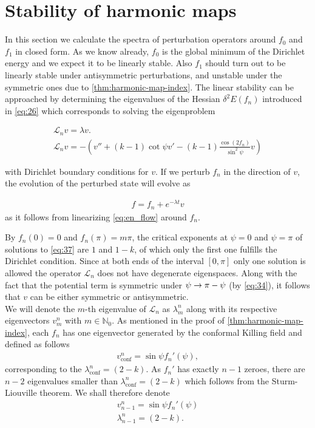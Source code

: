 \section{Stability of harmonic maps}
\label{sec:stab-ground-stat}

In this section we calculate the spectra of perturbation operators
around $f_0$ and $f_1$ in closed form. As we know already, $f_0$ is
the global minimum of the Dirichlet energy and we expect it to be
linearly stable. Also $f_1$ should turn out to be linearly stable
under antisymmetric perturbations, and unstable under the symmetric
ones due to \ref{thm:harmonic-map-index}. The linear stability can be
approached by determining the eigenvalues of the Hessian
$\delta^2E(f_n)$ introduced in \eqref{eq:26} which corresponds to
solving the eigenproblem

\begin{align}
  \label{eq:f0_L}
  \mathcal{L}_n v = \lambda v. \\
  \label{eq:37}
  \mathcal{L}_n v = -\left(v''+(k-1)\cot\psi
    v'-(k-1)\frac{\cos(2f_n)}{\sin^2\psi}v\right)
\end{align}

with Dirichlet boundary conditions for $v$. If we perturb $f_n$ in the
direction of $v$, the evolution of the perturbed state will evolve as

\begin{align}
  \label{eq:42}
  f=f_n+e^{-\lambda t}v
\end{align}
as it follows from linearizing \eqref{eq:en_flow} around $f_n$.

By $f_n(0)=0$ and $f_n(\pi)=m\pi$, the critical exponents at $\psi=0$
and $\psi=\pi$ of solutions to \eqref{eq:37} are $1$ and $1-k$, of
which only the first one fulfills the Dirichlet condition. Since at
both ends of the interval $[0,\pi]$ only one solution is allowed the
operator $\mathcal{L}_n$ does not have degenerate eigenspaces. Along
with the fact that the potential term is symmetric under
$\psi\rightarrow\pi-\psi$ (by \eqref{eq:34}), it follows that $v$
can be either symmetric or antisymmetric.\\

We will denote the $m$-th eigenvalue of $\mathcal{L}_n$ as
$\lambda_m^n$ along with its respective eigenvectors $v_m^n$ with
$m\in\mathbb{N}_0$. As mentioned in the proof of
\ref{thm:harmonic-map-index}, each $f_n$ has one eigenvector generated
by the conformal Killing field and defined as follows
\begin{align}
  \label{eq:43}
  v_{\text{conf}}^n=\sin\psi f_n'(\psi),
\end{align}
corresponding to the $\lambda_{\text{conf}}^n=(2-k)$. As $f_n'$ has
exactly $n-1$ zeroes, there are $n-2$ eigenvalues smaller than
$\lambda_{\text{conf}}^n=(2-k)$ which follows from the Sturm-Liouville
theorem. We shall therefore denote
\begin{align}
  \label{eq:46}
  v_{n-1}^n=\sin\psi f_n'(\psi)\\
  \lambda_{n-1}^n=(2-k).
\end{align}

